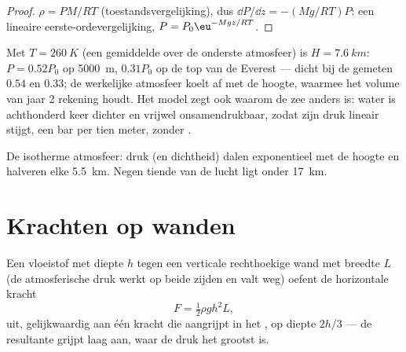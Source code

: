 \begin{proof}
$\rho = PM/RT$ (toestandsvergelijking), dus $\dd P/\dd z = -(Mg/RT)P$: een
lineaire eerste-ordevergelijking, $P = P_0\eu^{-Mgz/RT}$.
\end{proof}

\begin{example}\label{ex:b1:fluid-statics:altitude}
Met $T = \qty{260}{K}$ (een gemiddelde over de onderste atmosfeer) is $H =
\qty{7.6}{km}$: $P = 0.52P_0$ op \qty{5000}{m}, $0.31P_0$ op de top van de
Everest --- dicht bij de gemeten $0.54$ en $0.33$; de werkelijke atmosfeer
koelt af met de hoogte, waarmee het volume van jaar 2 rekening houdt. Het
model zegt ook waarom de zee anders is: water is achthonderd keer
dichter en vrijwel onsamendrukbaar, zodat zijn druk lineair stijgt, een bar
per tien meter, zonder .
\end{example}

\begin{omfigure}

{\small De isotherme atmosfeer: druk (en dichtheid) dalen
exponentieel met de hoogte en halveren elke \qty{5.5}{km}. Negen tiende van
de lucht ligt onder \qty{17}{km}.}
\end{omfigure}

\section{Krachten op wanden}

\begin{proposition}\label{prop:b1:fluid-statics:wall}
Een vloeistof met diepte $h$ tegen een verticale rechthoekige wand met breedte $L$
(de atmosferische druk werkt op beide zijden en valt weg) oefent de
horizontale kracht
\[
F = \tfrac12\rho gh^2L ,
\]
uit, gelijkwaardig aan één kracht die aangrijpt in het \emph{},
op diepte $2h/3$ --- de resultante grijpt laag aan, waar de druk het
grootst is.
\end{proposition}

